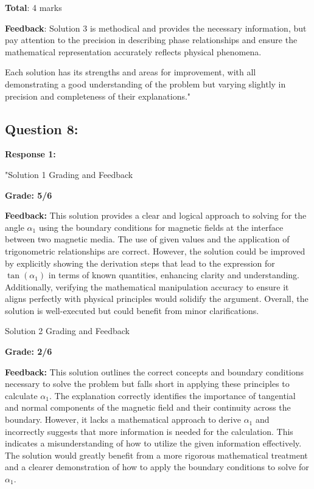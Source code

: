 \documentclass[a4paper,11pt]{article}
\begin{document}
\textbf{Total}: 4 marks

\textbf{Feedback}: Solution 3 is methodical and provides the necessary information, but pay attention to the precision in describing phase relationships and ensure the mathematical representation accurately reflects physical phenomena.

Each solution has its strengths and areas for improvement, with all demonstrating a good understanding of the problem but varying slightly in precision and completeness of their explanations."

\subsection*{Question 8:}

\textbf{Response 1:}

"Solution 1 Grading and Feedback

\textbf{Grade: 5/6}

\textbf{Feedback:} This solution provides a clear and logical approach to solving for the angle \( \alpha_{1} \) using the boundary conditions for magnetic fields at the interface between two magnetic media. The use of given values and the application of trigonometric relationships are correct. However, the solution could be improved by explicitly showing the derivation steps that lead to the expression for \( \tan(\alpha_{1}) \) in terms of known quantities, enhancing clarity and understanding. Additionally, verifying the mathematical manipulation accuracy to ensure it aligns perfectly with physical principles would solidify the argument. Overall, the solution is well-executed but could benefit from minor clarifications.

Solution 2 Grading and Feedback

\textbf{Grade: 2/6}

\textbf{Feedback:} This solution outlines the correct concepts and boundary conditions necessary to solve the problem but falls short in applying these principles to calculate \( \alpha_{1} \). The explanation correctly identifies the importance of tangential and normal components of the magnetic field and their continuity across the boundary. However, it lacks a mathematical approach to derive \( \alpha_{1} \) and incorrectly suggests that more information is needed for the calculation. This indicates a misunderstanding of how to utilize the given information effectively. The solution would greatly benefit from a more rigorous mathematical treatment and a clearer demonstration of how to apply the boundary conditions to solve for \( \alpha_{1} \).
\end{document}
